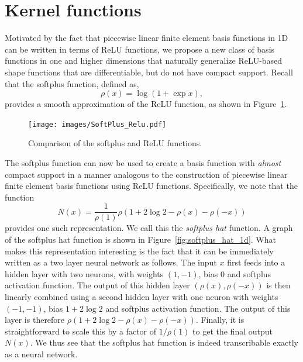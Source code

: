 \documentclass[12pt]{article}
\begin{document}
\section{Kernel functions} \label{app:softplus}
Motivated by the fact that piecewise linear finite element basis functions in 1D can be written in terms of ReLU functions, we propose a new class of basis functions in one and higher dimensions that naturally generalize ReLU-based shape functions that are differentiable, but do not have compact support. Recall that the softplus function, defined as,
\begin{equation} \label{eq:softplus}
\rho(x) = \log (1 + \exp x),
\end{equation}
provides a smooth approximation of the ReLU function, as shown in Figure~\ref{fig:softplus_relu}.

\begin{figure}[htpb]
\centering
\texttt{[image: images/SoftPlus\_Relu.pdf]}
\caption{Comparison of the softplus and ReLU functions.}
\label{fig:softplus_relu}
\end{figure}

The softplus function can now be used to create a basis function with \emph{almost} compact support in a manner analogous to the construction of piecewise linear finite element basis functions using ReLU functions. Specifically, we note that the function 
\begin{displaymath}
N(x) = \frac{1}{\rho(1)}\rho\left(1 + 2\log 2 - \rho(x) - \rho(-x)\right)
\end{displaymath}
provides one such representation. We call this the \emph{softplus hat} function. A graph of the softplus hat function is shown in Figure~\ref{fig:softplus_hat_1d}. What makes this representation interesting is the fact that it can be immediately written as a two layer neural network as follows.  The input $x$ first feeds into a hidden layer with two neurons, with weights $(1, -1)$, bias $0$ and softplus activation function. The output of this hidden layer $(\rho(x), \rho(-x))$ is then linearly combined using a second hidden layer with one neuron with weights $(-1, -1)$, bias $1 + 2\log 2$ and softplus activation function. The output of this layer is therefore $\rho\left(1 + 2\log 2 - \rho(x) - \rho(-x)\right)$. Finally, it is straightforward to scale this by a factor of $1/\rho(1)$ to get the final output $N(x)$. We thus see that the softplus hat function is indeed transcribable exactly as a neural network. 
\end{document}
